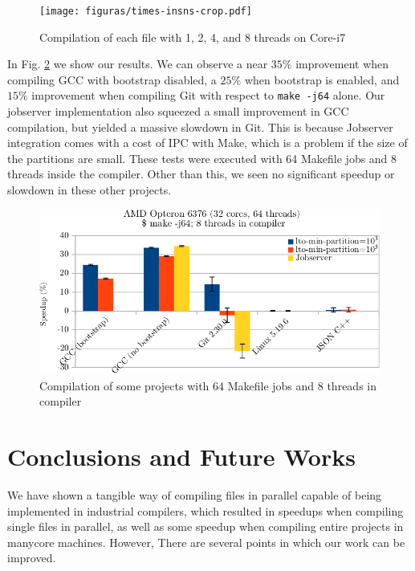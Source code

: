 \documentclass[runningheads]{llncs}
\begin{document}
\begin{figure}
\centering
	 \texttt{[image: figuras/times-insns-crop.pdf]}
	  \caption{Compilation of each file with 1, 2, 4, and 8 threads on
	  Core-i7}
	  \label{fig:gcc_all_files}
\end{figure}

In Fig. \ref{fig:gcc_projects} we show our results. We can observe
a near $35\%$ improvement when compiling GCC with bootstrap disabled,
a $25\%$ when bootstrap is enabled, and $15\%$
improvement when compiling Git with respect to
\texttt{make -j64} alone. Our jobserver implementation also
squeezed a small improvement in GCC compilation, but yielded a massive
slowdown in Git. This is because Jobserver integration comes with
a cost of IPC with Make, which is a problem if the size of the partitions
are small.  These tests were executed with 64 Makefile
jobs and 8 threads inside the compiler. Other than this, we seen
no significant speedup or slowdown in these other projects.

\begin{figure}
\centering
	 \includegraphics[scale=0.8]{figuras/experiment_projects_new-crop.pdf}
	  \caption{Compilation of some projects with 64 Makefile jobs and 8 threads in compiler}
	  \label{fig:gcc_projects}
\end{figure}

\section{Conclusions and Future Works}\label{sec:future_works}

We have shown a tangible way of compiling files in parallel capable
of being implemented in industrial compilers, which resulted in
speedups when compiling single files in parallel, as well as some
speedup when compiling entire projects in manycore machines. However,
There are several points in which our work can be improved.
\end{document}
